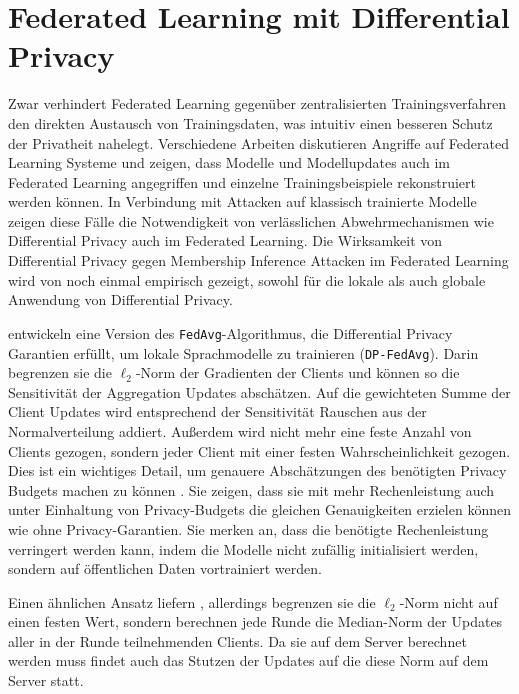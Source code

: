 \section{Federated Learning mit Differential Privacy}\label{sec:rw-fldp}
Zwar verhindert Federated Learning gegenüber zentralisierten Trainingsverfahren den direkten Austausch von Trainingsdaten, was intuitiv einen besseren Schutz der Privatheit nahelegt. Verschiedene Arbeiten \cite{wang:2019, geiping:2020, ma:2020} diskutieren Angriffe auf Federated Learning Systeme und zeigen, dass Modelle und Modellupdates auch im Federated Learning angegriffen und einzelne Trainingsbeispiele rekonstruiert werden können. In Verbindung mit Attacken auf klassisch trainierte Modelle zeigen diese Fälle die Notwendigkeit von verlässlichen Abwehrmechanismen wie Differential Privacy auch im Federated Learning. Die Wirksamkeit von Differential Privacy gegen Membership Inference Attacken im Federated Learning wird von \textcite{naseri:2022} noch einmal empirisch gezeigt, sowohl für die lokale als auch globale Anwendung von Differential Privacy.

\textcite{mcmahan:2018} entwickeln eine Version des \texttt{FedAvg}-Algorithmus, die Differential Privacy Garantien erfüllt, um lokale Sprachmodelle zu trainieren (\texttt{DP-FedAvg}). Darin begrenzen sie die $\ell_2$-Norm der Gradienten der Clients und können so die Sensitivität der Aggregation Updates abschätzen. Auf die gewichteten Summe der Client Updates wird entsprechend der Sensitivität Rauschen aus der Normalverteilung addiert. Außerdem wird nicht mehr eine feste Anzahl von Clients gezogen, sondern jeder Client mit einer festen Wahrscheinlichkeit gezogen. Dies ist ein wichtiges Detail, um genauere Abschätzungen des benötigten Privacy Budgets machen zu können \cite{wang:2020}. Sie zeigen, dass sie mit mehr Rechenleistung auch unter Einhaltung von Privacy-Budgets die gleichen Genauigkeiten erzielen können wie ohne Privacy-Garantien. Sie merken an, dass die benötigte Rechenleistung verringert werden kann, indem die Modelle nicht zufällig initialisiert werden, sondern auf öffentlichen Daten vortrainiert werden.

Einen ähnlichen Ansatz liefern \textcite{geyer:2017}, allerdings begrenzen sie die $\ell_2$-Norm nicht auf einen festen Wert, sondern berechnen jede Runde die Median-Norm der Updates aller in der Runde teilnehmenden Clients. Da sie auf dem Server berechnet werden muss findet auch das Stutzen der Updates auf die diese Norm auf dem Server statt. 

